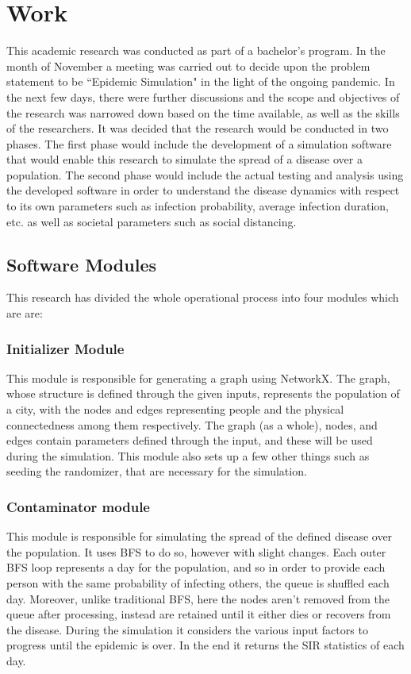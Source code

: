 \documentclass[conference]{IEEEtran}
\begin{document}
    \section{Work}
    This academic research was conducted as part of a bachelor's program. In the month of November a meeting was carried out to decide upon the problem statement to be ``Epidemic Simulation" in the light of the ongoing pandemic. In the next few days, there were further discussions and the scope and objectives of the research was narrowed down based on the time available, as well as the skills of the researchers. It was decided that the research would be conducted in two phases. The first phase would include the development of a simulation software that would enable this research to simulate the spread of a disease over a population. The second phase would include the actual testing and analysis using the developed software in order to understand the disease dynamics with respect to its own parameters such as infection probability, average infection duration, etc. as well as societal parameters such as social distancing.
    \subsection{Software Modules}
    This research has divided the whole operational process into four modules which are are:\\
        \subsubsection{Initializer Module}
			This module is responsible for generating a graph using NetworkX. The graph, whose structure is defined through the given inputs, represents the population of a city, with the nodes and edges representing people and the physical connectedness among them respectively. The graph (as a whole), nodes, and edges contain parameters defined through the input, and these will be used during the simulation. This module also sets up a few other things such as seeding the randomizer, that are necessary for the simulation.\\
		\subsubsection{Contaminator module}
			This module is responsible for simulating the spread of the defined disease over the population. It uses BFS to do so, however with slight changes. Each outer BFS loop represents a day for the population, and so in order to provide each person with the same probability of infecting others, the queue is shuffled each day. Moreover, unlike traditional BFS, here the nodes aren't removed from the queue after processing, instead are retained until it either dies or recovers from the disease. During the simulation it considers the various input factors to progress until the epidemic is over. In the end it returns the SIR statistics of each day.\\
\end{document}
